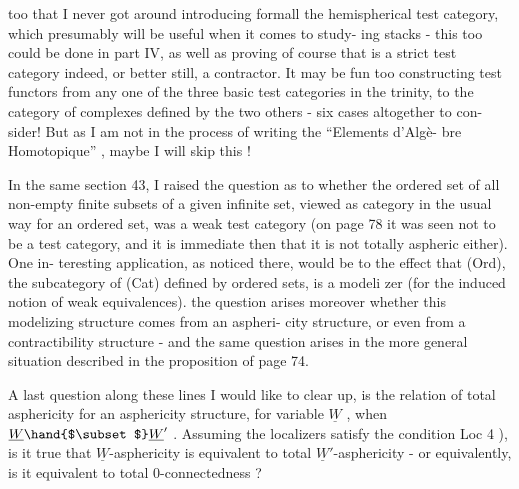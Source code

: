 
too that I never got around introducing formall the hemispherical test
category, which presumably will be  useful when it comes to study-%
ing stacks - this too could be done in part IV, as well as proving
of course that \hand{$\bigcirc$} is a strict test category indeed, or better still,
a contractor. It may be fun too constructing test functors from any
one of the three basic test categories in the trinity, to the category
of complexes defined by the two others - six cases altogether to con-%
sider! But as I am not in the process of writing the ``Elements d'Algè-%
bre Homotopique'' , maybe I will skip this !

In the same section 43, I raised the question as to whether the
ordered set of all non-empty finite subsets of a given infinite set,
viewed as  category in the usual way for an ordered set, was a weak
test category (on page 78 it was seen not to be a test category, and
it is immediate then that it is not totally aspheric either). One in-%
teresting application, as noticed there, would be to the effect that
(Ord), the subcategory of (Cat) defined by ordered sets, is a modeli%
zer (for the induced notion of weak equivalences).  the question
arises moreover whether this modelizing structure comes from an aspheri-%
city structure, or even from a contractibility structure - and the
same question arises in the more general situation described in the
proposition of page 74.

A last question along these lines I would like to clear up,
is the relation of total asphericity for an asphericity structure,
for variable $\underline{W}$ , when $\underline{W} \hand{$\subset$} \underline{W}'$ . Assuming the localizers satisfy
the condition Loc 4 ), is it true that  $\underline{W}$-asphericity is equivalent
to total $\underline{W}'$-asphericity -  or equivalently, is it equivalent
to total 0-connectedness ?

